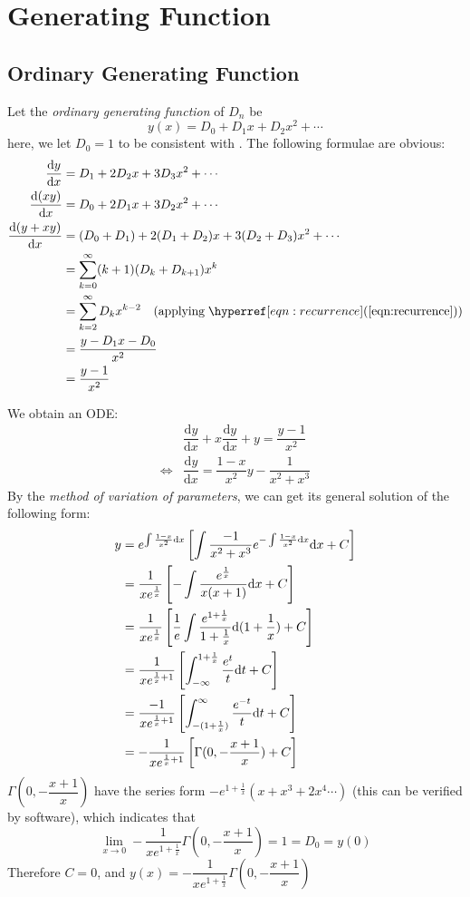 
\section{Generating Function}
\subsection{Ordinary Generating Function}
Let the \emph{ordinary generating function} of $ D_n$ be
\[ y(x) = D_0 + D_1x+D_2x^2+\cdots \]
here, we let $ D_0=1$ to be consistent with .
The following formulae are obvious:
\begin{align*}
 \dfrac{\mathrm{d}y}{\mathrm{d}x} &= D_1+2D_2x+3D_3x^2+\cdots  \\
 \dfrac{\mathrm{d}(xy)}{\mathrm{d}x} &=D_0+2D_1x+3D_2x^2+\cdots \\
 \dfrac{\mathrm{d}(y+xy)}{\mathrm{d}x} &= (D_0 +D_1) + 2(D_1+D_2)x+3(D_2+D_3)x^2+\cdots \\
 &=\sum_{k=0}^{\infty}(k+1)(D_{k}+D_{k+1})x^k \\
 &=\sum_{k=2}^{\infty}D_kx^{k-2} \quad (\text{applying}\; \eqnref{recurrence}) \\
 &=\dfrac{y-D_1x-D_0}{x^2}\\
 &=\dfrac{y-1}{x^2}
\end{align*}

We obtain an ODE:
 \begin{align*}
& \dfrac{\mathrm{d}y}{\mathrm{d}x}+x\dfrac{\mathrm{d}y}{\mathrm{d}x} +y=\dfrac{y-1}{x^2}\\
\Leftrightarrow &\dfrac{\mathrm{d}y}{\mathrm{d}x}=\dfrac{1-x}{x^2}y -\dfrac{1}{x^2+x^3}
 \end{align*}
By the \emph{method of variation of parameters},
we can get its general solution of the following form:
\begin{align*}
y&=e^{\Oldint\frac{1-x}{x^2}\mathrm{d}x}\left[\int\dfrac{-1}{x^2+x^3}e^{-\Oldint\frac{1-x}{x^2}\mathrm{d}x}\mathrm{d}x+C\right] \\
&=\dfrac{1}{xe^{\frac{1}{x}}}\left[-\int\dfrac{e^{\frac{1}{x}}}{x(x+1)}\mathrm{d}x+C\right] \\
& =\dfrac{1}{xe^{\frac{1}{x}}}\left[\dfrac{1}{e}\int\dfrac{e^{1+\frac{1}{x}}}{1+\frac{1}{x}}\mathrm{d}(1+\dfrac{1}{x})+C\right]\\
&=\dfrac{1}{xe^{\frac{1}{x}+1}}\left[\int_{-\infty}^{1+\frac{1}{x}}\dfrac{e^t}{t}\mathrm{d}t+C\right]\\
&=\dfrac{-1}{xe^{\frac{1}{x}+1}}\left[\int_{-(1+\frac{1}{x})}^{\infty}\dfrac{e^{-t}}{t}\mathrm{d}t+C\right]\\
&=-\dfrac{1}{xe^{\frac{1}{x}+1}}\left[\Gamma(0,-\dfrac{x+1}{x})+C\right]
\end{align*}
$\Gamma(0,-\dfrac{x+1}{x})$ have the series form $ -e^{1+\frac{1}{x}}(x+x^3+2 x^4\cdots )$
(this can be verified by software), which indicates that
\[ \lim\limits_{x\to0}-\dfrac{1}{xe^{1+\frac{1}{x}}}\Gamma(0, -\dfrac{x+1}{x}) = 1 = D_0=y(0)\]
Therefore $ C=0$, and $ y(x) = -\dfrac{1}{xe^{1+\frac{1}{x}}}\Gamma(0, -\dfrac{x+1}{x})$

